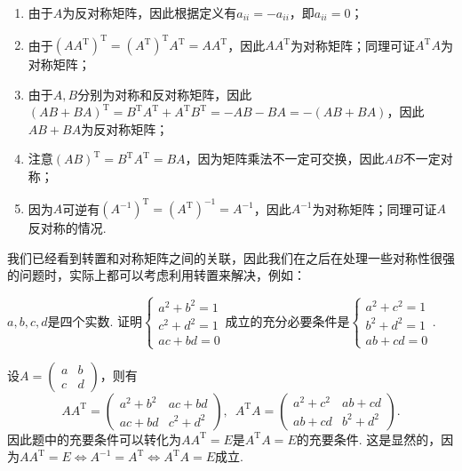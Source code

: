 \begin{solution}
    \begin{enumerate}
        \item 由于$A$为反对称矩阵，因此根据定义有$a_{ii}=-a_{ii}$，即$a_{ii}=0$；
        \item 由于$(AA^\mathrm{T})^\mathrm{T}=(A^\mathrm{T})^\mathrm{T}A^\mathrm{T}=AA^\mathrm{T}$，因此$AA^\mathrm{T}$为对称矩阵；同理可证$A^\mathrm{T}A$为对称矩阵；
        \item 由于$A,B$分别为对称和反对称矩阵，因此$(AB+BA)^\mathrm{T}=B^\mathrm{T}A^\mathrm{T}+A^\mathrm{T}B^\mathrm{T}=-AB-BA=-(AB+BA)$，因此$AB+BA$为反对称矩阵；
        \item 注意$(AB)^\mathrm{T}=B^\mathrm{T}A^\mathrm{T}=BA$，因为矩阵乘法不一定可交换，因此$AB$不一定对称；
        \item 因为$A$可逆有$(A^{-1})^\mathrm{T}=(A^\mathrm{T})^{-1}=A^{-1}$，因此$A^{-1}$为对称矩阵；同理可证$A$反对称的情况.
    \end{enumerate}
\end{solution}

我们已经看到转置和对称矩阵之间的关联，因此我们在之后在处理一些对称性很强的问题时，实际上都可以考虑利用转置来解决，例如：
\begin{example}
    $a,b,c,d$是四个实数. 证明$\begin{cases}
            a^2+b^2=1 \\
            c^2+d^2=1 \\
            ac+bd=0
        \end{cases}$成立的充分必要条件是$\begin{cases}
            a^2+c^2=1 \\
            b^2+d^2=1 \\
            ab+cd=0
        \end{cases}$.
\end{example}

\begin{solution}
    设$A=\begin{pmatrix}
        a & b \\ c & d
    \end{pmatrix}$，则有
    \[AA^\mathrm{T}=\begin{pmatrix}
            a^2+b^2 & ac+bd \\ ac+bd & c^2+d^2
        \end{pmatrix},\enspace A^\mathrm{T}A=\begin{pmatrix}
            a^2+c^2 & ab+cd \\ ab+cd & b^2+d^2
        \end{pmatrix}.\]
    因此题中的充要条件可以转化为$AA^\mathrm{T}=E$是$A^\mathrm{T}A=E$的充要条件. 这是显然的，因为$AA^\mathrm{T}=E\iff A^{-1}=A^\mathrm{T}\iff A^\mathrm{T}A=E$成立.
\end{solution}

